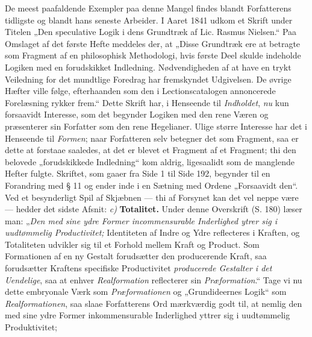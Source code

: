 \documentclass[12pt,a4paper]{book}
\newcommand{\opage}[1]{\marginnote{\footnotesize\textit{[#1]}}}
\begin{document}
De meest paafaldende Exempler paa denne Mangel
findes blandt Forfatterens tidligste og blandt hans seneste
Arbeider. I Aaret 1841 udkom et Skrift under Titelen „Den speculative Logik i dens Grundtræk af Lic.
Rasmus Nielsen.“ Paa Omslaget af det første Hefte
meddeles der, at „Disse Grundtræk ere at betragte som
Fragment af en philosophisk Methodologi, hvis første
Deel skulde indeholde Logiken med en forudskikket Indledning. Nødvendigheden af at have en trykt Veiledning
for det mundtlige Foredrag har fremskyndet Udgivelsen. De
øvrige Hæfter ville følge, efterhaanden som den i Lectionscatalogen annoncerede Forelæsning rykker frem.“ Dette
Skrift har, i Henseende til \emph{Indholdet}, \emph{nu} kun forsaavidt Interesse, som det begynder Logiken med den
rene Væren og præsenterer sin Forfatter som den rene
Hegelianer. Ulige større Interesse har det i Henseende
til \emph{Formen}; naar Forfatteren selv betegner det som
Fragment, saa er dette at forstaae saaledes, at det er
blevet et Fragment af et Fragment; thi den belovede
„forudskikkede Indledning“ kom aldrig, ligesaalidt som de
manglende Hefter fulgte. Skriftet, som gaaer fra Side
1 til Side 192, begynder til en Forandring med § 11
og ender inde i en Sætning med Ordene „Forsaavidt
\opage{94}\setcounter{footnote}{0}%
den“. Ved et besynderligt Spil af Skjæbnen --- thi
af Forsynet kan det vel neppe være --- hedder det
sidste Afsnit: \textit{c)} \textbf{Totalitet.} Under denne Overskrift
(S. 180) læser man: „\emph{Den med sine ydre Former
incommensurable Inderlighed ytrer sig i
uudtømmelig Productivitet;} Identiteten af Indre
og Ydre reflecteres i Kraften, og Totaliteten udvikler sig
til et Forhold mellem Kraft og Product. Som Formationen
af en ny Gestalt forudsætter den producerende
Kraft, saa forudsætter Kraftens specifiske Productivitet
\emph{producerede Gestalter i det Uendelige}, saa at
enhver \emph{Realformation} reflecterer sin \emph{Præformation}.“
Tage vi nu dette embryonale Værk som \emph{Præformationen}
og „Grundideernes Logik“ som \emph{Realformationen},
saa slaae Forfatterens Ord mærkværdig godt
til, at nemlig den med sine ydre Former inkommensurable
Inderlighed yttrer sig i uudtømmelig Produktivitet;
\end{document}
